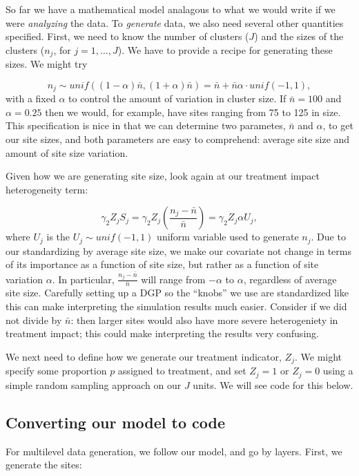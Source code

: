 \documentclass[
]{book}
\begin{document}
So far we have a mathematical model analagous to what we would write if we were \emph{analyzing} the data.
To \emph{generate} data, we also need several other quantities specified.
First, we need to know the number of clusters (\(J\)) and the sizes of the clusters (\(n_j\), for \(j = 1, \ldots, J\)).
We have to provide a recipe for generating these sizes. We might try

\[ n_j \sim unif( (1-\alpha)\bar{n}, (1+\alpha)\bar{n} ) = \bar{n} + \bar{n}\alpha \cdot unif(-1, 1) ,\]
with a fixed \(\alpha\) to control the amount of variation in cluster size.
If \(\bar{n} = 100\) and \(\alpha = 0.25\) then we would, for example, have sites ranging from 75 to 125 in size.
This specification is nice in that we can determine two parametes, \(\bar{n}\) and \(\alpha\), to get our site sizes, and both parameters are easy to comprehend: average site size and amount of site size variation.

Given how we are generating site size, look again at our treatment impact heterogeneity term:

\[ \gamma_2 Z_j S_j = \gamma_2 Z_j \left(\frac{n_j - \bar{n}}{\bar{n}}\right) = \gamma_2 Z_j \alpha U_j, \]
where \(U_j\) is the \(U_j \sim unif(-1,1)\) uniform variable used to generate \(n_j\).
Due to our standardizing by average site size, we make our covariate not change in terms of its importance as a function of site size, but rather as a function of site variation \(\alpha\).
In particular, \(\frac{n_j - \bar{n}}{\bar{n}}\) will range from \(-\alpha\) to \(\alpha\), regardless of average site size.
Carefully setting up a DGP so the ``knobs'' we use are standardized like this can make interpreting the simulation results much easier.
Consider if we did not divide by \(\bar{n}\): then larger sites would also have more severe heterogeniety in treatment impact; this could make interpreting the results very confusing.

We next need to define how we generate our treatment indicator, \(Z_j\).
We might specify some proportion \(p\) assigned to treatment, and set \(Z_j = 1\) or \(Z_j = 0\) using a simple random sampling approach on our \(J\) units.
We will see code for this below.

\hypertarget{converting-our-model-to-code}{%
\subsection{Converting our model to code}\label{converting-our-model-to-code}}

For multilevel data generation, we follow our model, and go by layers.
First, we generate the sites:
\end{document}
